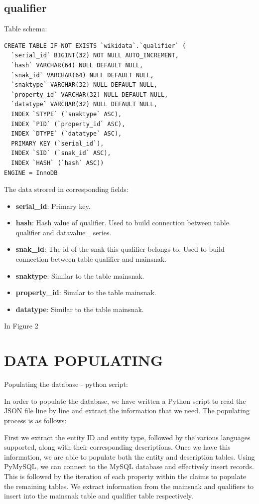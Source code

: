 \documentclass[12pt]{article}
\begin{document}
\subsection{qualifier}
\lstset{language=SQL}
Table schema:
\begin{lstlisting}
CREATE TABLE IF NOT EXISTS `wikidata`.`qualifier` (
  `serial_id` BIGINT(32) NOT NULL AUTO_INCREMENT,
  `hash` VARCHAR(64) NULL DEFAULT NULL,
  `snak_id` VARCHAR(64) NULL DEFAULT NULL,
  `snaktype` VARCHAR(32) NULL DEFAULT NULL,
  `property_id` VARCHAR(32) NULL DEFAULT NULL,
  `datatype` VARCHAR(32) NULL DEFAULT NULL,
  INDEX `STYPE` (`snaktype` ASC),
  INDEX `PID` (`property_id` ASC),
  INDEX `DTYPE` (`datatype` ASC),
  PRIMARY KEY (`serial_id`),
  INDEX `SID` (`snak_id` ASC),
  INDEX `HASH` (`hash` ASC))
ENGINE = InnoDB
\end{lstlisting}
The data strored in corresponding fields:
\begin{itemize}
\item \textbf{serial\_id}: Primary key.
\item \textbf{hash}: Hash value of qualifier. Used to build connection between table qualifier and datavalue\_ series.
\item \textbf{snak\_id}: The id of the snak this qualifier belongs to. Used to build connection between table qualifier and mainsnak.
\item \textbf{snaktype}: Similar to the table mainsnak.
\item \textbf{property\_id}: Similar to the table mainsnak.
\item \textbf{datatype}: Similar to the table mainsnak.
\end{itemize}
In Figure 2
\section{DATA POPULATING}
Populating the database - python script:

In order to populate the database, we have written a Python script to read the JSON file line by line and extract the information that we need. The populating process is as follows:

First we extract the entity ID and entity type, followed by the various languages supported, along with their corresponding descriptions. Once we have this information, we are able to populate both the entity and description tables. Using PyMySQL, we can connect to the MySQL database and effectively insert records. This is followed by the iteration of each property within the claims to populate the remaining tables. We extract information from the mainsnak and qualifiers to insert into the mainsnak table and qualifier table respectively.
\end{document}
